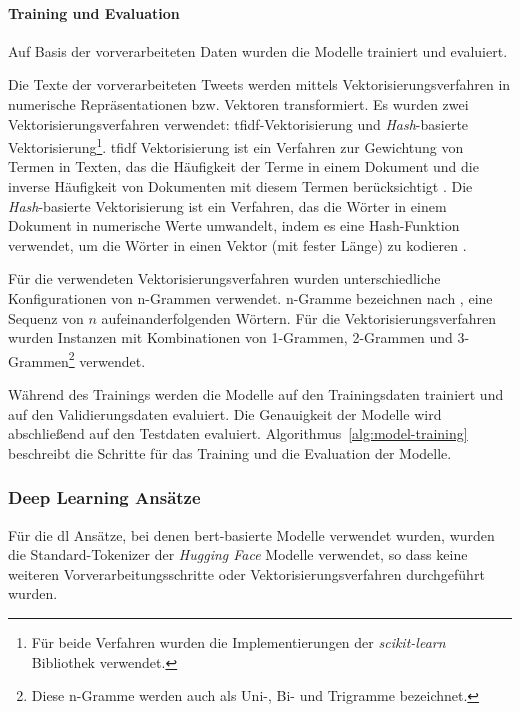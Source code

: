 \paragraph{Training und Evaluation}
Auf Basis der vorverarbeiteten Daten wurden die Modelle trainiert und evaluiert.

Die Texte der vorverarbeiteten Tweets werden mittels Vektorisierungsverfahren in numerische Repräsentationen bzw. Vektoren transformiert.
Es wurden zwei Vekto\-risierungs\-verfahren verwendet: \gls{tfidf}-Vek\-to\-ri\-sie\-rung und \textit{Hash}-basierte Vektorisierung\footnote{Für beide Verfahren wurden die Implementierungen der \textit{scikit-learn} Bibliothek verwendet.}.
\gls{tfidf} Vektorisierung ist ein Verfahren zur Gewichtung von Termen in Texten, das die Häufigkeit der Terme in einem Dokument und die inverse Häufigkeit von Dokumenten mit diesem Termen berücksichtigt \cite[S. 119]{manning2009introduction}.
Die \textit{Hash}-basierte Vektorisierung ist ein Verfahren, das die Wörter in einem Dokument in numerische Werte umwandelt, indem es eine Hash-Funktion verwendet, um die Wörter in einen Vektor (mit fester Länge) zu kodieren \cite{sklearnextraction2025}.

Für die verwendeten Vektorisierungsverfahren wurden unterschiedliche Konfigurationen von n-Grammen verwendet.
n-Gramme bezeichnen nach \cite[S.33]{jm3}, eine Sequenz von $n$ aufeinanderfolgenden Wörtern.
Für die Vektorisierungsverfahren wurden Instanzen mit Kombinationen von 1-Grammen, 2-Grammen und 3-Grammen\footnote{Diese n-Gramme werden auch als Uni-, Bi- und Trigramme bezeichnet.} verwendet.

Während des Trainings werden die Modelle auf den Trainingsdaten trainiert und auf den Validierungsdaten evaluiert.
Die Genauigkeit der Modelle wird abschließend auf den Testdaten evaluiert.
Algorithmus~\ref{alg:model-training} beschreibt die Schritte für das Training und die Evaluation der Modelle.

\subsubsection{Deep Learning Ansätze} \label{subsubsec:experimente-deep-learning-ansaetze}

Für die \gls{dl} Ansätze, bei denen \gls{bert}-basierte Modelle verwendet wurden, wurden die Standard-Tokenizer der \textit{Hugging Face} Modelle verwendet, so dass keine weiteren Vorverarbeitungsschritte oder Vektorisierungsverfahren durchgeführt wurden.

